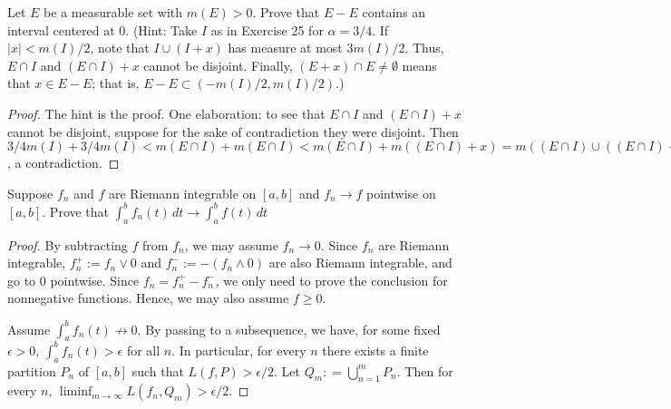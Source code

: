  Let $E$ be a measurable set with $m(E) > 0$. Prove that $E-E$ contains an interval centered at 0. (Hint: Take $I$ as in Exercise 25 for $\alpha = 3/4$. If $|x| < m(I)/2$, note that $I \cup (I + x)$ has measure at most $3m(I)/2$. Thus, $E \cap I $ and $(E \cap I) + x$ cannot be disjoint. Finally, $(E+x) \cap E \neq \emptyset$ means that $x \in E - E$; that is, $E - E \subset (-m(I)/2, m(I)/2)$.)
\begin{proof}
The hint is the proof.  One elaboration: to see that $E \cap I$ and $(E \cap I) +x$ cannot be disjoint, suppose for the sake of contradiction they were disjoint.  Then $3/4 m(I) + 3/4 m(I) < m(E \cap I) + m(E \cap I) < m(E \cap I) + m((E \cap I) + x) = m((E \cap I) \cup ((E \cap I) + x)) = m (E \cap (I \cup (I+x))) \leq m(I \cup I +x) \leq 3/2 m(I)$, a contradiction.
\end{proof}

\begin{comment}
\p{J16.1.1} Suppose $f_n \in C[0,1], 0 \leq f_n \leq 1$, and $f_n \rightarrow 0$ pointwise on $[0,1]$. Prove that $\int_0^1 f_n(t)\,dt \rightarrow 0$ as $n \rightarrow \infty$.
\begin{proof}
\end{proof}
\end{comment}

 Suppose $f_n$ and $f$ are Riemann integrable on $[a,b]$ and $f_n \rightarrow f$ pointwise on $[a,b]$. Prove that $\int_a^b f_n(t) \, dt \rightarrow \int_a^b f(t)\, dt$
\begin{proof}
By subtracting $f$ from $f_n$, we may assume $f_n \rightarrow 0$.  Since $f_n$ are Riemann integrable, $f_n^+ := f_n \vee 0$  and $f_n^- := -(f_n \wedge 0)$ are also Riemann integrable, and go to 0 pointwise.  Since $f_n = f_n^+ - f_n^-$, we only need to prove the conclusion for nonnegative functions. Hence, we may also assume $f \geq 0$.

Assume $\int_a^b f_n(t) \not\rightarrow 0$.  By passing to a subsequence, we have, for some fixed $\epsilon > 0$, $\int_a^b f_n(t) > \epsilon$  for all $n$.  In particular, for every $n$ there exists a finite partition $P_n$ of $[a,b]$ such that $L(f,P) > \epsilon / 2$. Let $Q_m: = \bigcup_{n=1}^m P_n$. Then for every $n$, $\liminf_{m\rightarrow\infty} L(f_n, Q_m) > \epsilon/2$.

\end{proof}


